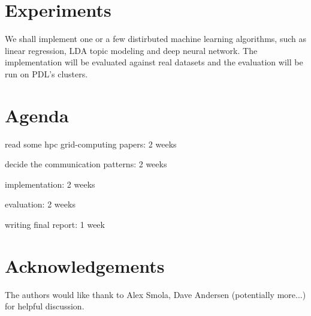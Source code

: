 \documentclass{acm_proc_article-sp}
\begin{document}
\section{Experiments}

We shall implement one or a few distirbuted machine learning algorithms, such as
 linear regression, LDA topic modeling and deep neural network. The
implementation will be evaluated against real datasets and the evaluation will
be run on PDL's clusters.

\section{Agenda}

\begin{itemize*}
\item read some hpc grid-computing papers: 2 weeks
\item decide the communication patterns: 2 weeks
\item implementation: 2 weeks
\item evaluation: 2 weeks
\item writing final report: 1 week
\end{itemize*}

\appendix
\section{Acknowledgements}
The authors would like thank to Alex Smola, Dave Andersen (potentially more...)
for helpful discussion.



\end{document}
